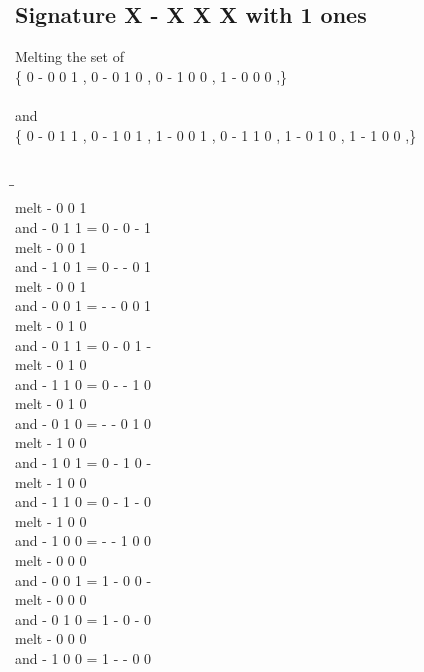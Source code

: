 \documentclass{article}
\begin{document}
\subsection{Signature X - X X X with 1 ones}
Melting the set of\\
\{ 0  -  0  0  1 , 0  -  0  1  0 , 0  -  1  0  0 , 1  -  0  0  0 ,\}\\\\
and\\
\{ 0  -  0  1  1 , 0  -  1  0  1 , 1  -  0  0  1 , 0  -  1  1  0 , 1  -  0  1  0 , 1  -  1  0  0 ,\}\\\\
\begin{tabbing}
\hspace{3cm}\=\hspace{3cm}\=\hspace{3cm}\\[1cm]
melt  -  0  0  1 \\
and  -  0  1  1 \>
 =  0  -  0  -  1 \\[1mm]
melt  -  0  0  1 \\
and  -  1  0  1 \>
 =  0  -  -  0  1 \\[1mm]
melt  -  0  0  1 \\
and  -  0  0  1 \>
 =  -  -  0  0  1 \\[1mm]
melt  -  0  1  0 \\
and  -  0  1  1 \>
 =  0  -  0  1  - \\[1mm]
melt  -  0  1  0 \\
and  -  1  1  0 \>
 =  0  -  -  1  0 \\[1mm]
melt  -  0  1  0 \\
and  -  0  1  0 \>
 =  -  -  0  1  0 \\[1mm]
melt  -  1  0  0 \\
and  -  1  0  1 \>
 =  0  -  1  0  - \\[1mm]
melt  -  1  0  0 \\
and  -  1  1  0 \>
 =  0  -  1  -  0 \\[1mm]
melt  -  1  0  0 \\
and  -  1  0  0 \>
 =  -  -  1  0  0 \\[1mm]
melt  -  0  0  0 \\
and  -  0  0  1 \>
 =  1  -  0  0  - \\[1mm]
melt  -  0  0  0 \\
and  -  0  1  0 \>
 =  1  -  0  -  0 \\[1mm]
melt  -  0  0  0 \\
and  -  1  0  0 \>
 =  1  -  -  0  0 \\[1mm]
\end{tabbing}
\newpage
\end{document}
